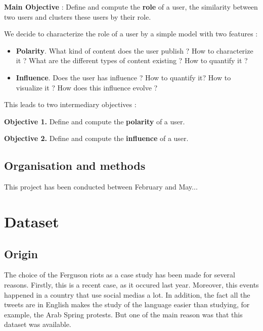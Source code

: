 \documentclass[a4paper,twoside,12pt,openright]{report}
\begin{document}
\begin{objbox}\color{Maroon}
\textbf{Main Objective} : Define and compute the \textbf{role} of a user, the similarity between two users and clusters these users by their role.
\end{objbox}

We decide to characterize the role of a user by a simple model with two features :
\begin{itemize}
\item \textbf{Polarity}. What kind of content does the user publish ? How to characterize it ? What are the different types of content existing ? How to quantify it ?
\item \textbf{Influence}. Does the user has influence ? How to quantify it? How to visualize it ? How does this influence evolve ?
\end{itemize}
This leads to two intermediary objectives : 
\begin{objbox}\color{Maroon}
\textbf{Objective 1.} Define and compute the \textbf{polarity} of a user.
\end{objbox}

\begin{objbox}\color{Maroon}
\textbf{Objective 2.} Define and compute the \textbf{influence} of a user.
\end{objbox}

\newpage

\section{Organisation and methods}
This project has been conducted between February and May...



\chapter{Dataset}

\section{Origin}
The choice of the Ferguson riots as a case study has been made for several reasons. Firstly, this is a recent case, as it occured last year. Moreover, this events happened in a country that use social medias a lot. In addition, the fact all the tweets are in English makes the study of the language easier than studying, for example, the Arab Spring protests. But one of the main reason was that this dataset was available.
\end{document}
